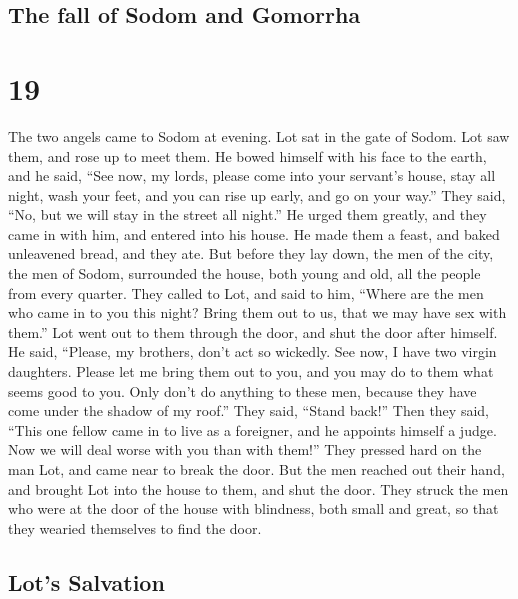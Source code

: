 \begin{paracol}{2}
\begin{otherlanguage}{english}
{\subsection{The fall of Sodom and
Gomorrha}\label{the-fall-of-sodom-and-gomorrha}}

\hypertarget{section-37}{%
\section{19}\label{section-37}}

 The two angels came to Sodom at evening. Lot sat in the
gate of Sodom. Lot saw them, and rose up to meet them. He bowed himself
with his face to the earth,  and he said, ``See now, my
lords, please come into your servant's house, stay all night, wash your
feet, and you can rise up early, and go on your way.'' They said, ``No,
but we will stay in the street all night.''  He urged them
greatly, and they came in with him, and entered into his house. He made
them a feast, and baked unleavened bread, and they ate. 
But before they lay down, the men of the city, the men of Sodom,
surrounded the house, both young and old, all the people from every
quarter.  They called to Lot, and said to him, ``Where are
the men who came in to you this night? Bring them out to us, that we may
have sex with them.''  Lot went out to them through the
door, and shut the door after himself.  He said, ``Please,
my brothers, don't act so wickedly.  See now, I have two
virgin daughters. Please let me bring them out to you, and you may do to
them what seems good to you. Only don't do anything to these men,
because they have come under the shadow of my roof.'' 
They said, ``Stand back!'' Then they said, ``This one fellow came in to
live as a foreigner, and he appoints himself a judge. Now we will deal
worse with you than with them!'' They pressed hard on the man Lot, and
came near to break the door.  But the men reached out
their hand, and brought Lot into the house to them, and shut the door.
 They struck the men who were at the door of the house
with blindness, both small and great, so that they wearied themselves to
find the door.

\hypertarget{lots-salvation}{%
\subsection{Lot's Salvation}\label{lots-salvation}}


\end{otherlanguage}
\end{paracol}
